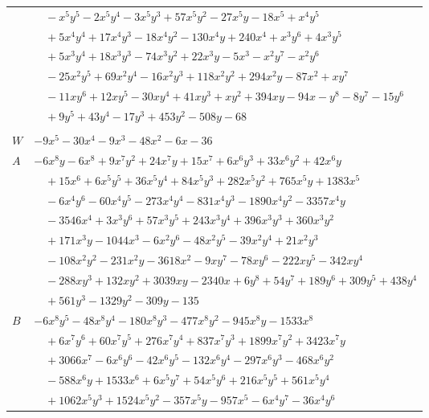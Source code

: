 \documentclass[11pt]{article}
\begin{document}
\begin{longtable}{@{}ll@{}}
 & $\quad -x^{5}y^{5}-2x^{5}y^{4}-3x^{5}y^{3}+57x^{5}y^{2}-27x^{5}y-18x^{5}+x^{4}y^{5}$\\
 & $\quad +5x^{4}y^{4}+17x^{4}y^{3}-18x^{4}y^{2}-130x^{4}y+240x^{4}+x^{3}y^{6}+4x^{3}y^{5}$\\
 & $\quad +5x^{3}y^{4}+18x^{3}y^{3}-74x^{3}y^{2}+22x^{3}y-5x^{3}-x^{2}y^{7}-x^{2}y^{6}$\\
 & $\quad -25x^{2}y^{5}+69x^{2}y^{4}-16x^{2}y^{3}+118x^{2}y^{2}+294x^{2}y-87x^{2}+xy^{7}$\\
 & $\quad -11xy^{6}+12xy^{5}-30xy^{4}+41xy^{3}+xy^{2}+394xy-94x-y^{8}-8y^{7}-15y^{6}$\\
 & $\quad +9y^{5}+43y^{4}-17y^{3}+453y^{2}-508y-68$\\
\addlinespace[3pt]
\multicolumn{2}{@{}l}{$g=2$, $i=26$, $m=1$, neighbours $46,3,5,10,11,13,15,23,24,36,40$}\\
$W$ & $-9x^{5}-30x^{4}-9x^{3}-48x^{2}-6x-36$\\
$A$ & $-6x^{8}y-6x^{8}+9x^{7}y^{2}+24x^{7}y+15x^{7}+6x^{6}y^{3}+33x^{6}y^{2}+42x^{6}y$\\
 & $\quad +15x^{6}+6x^{5}y^{5}+36x^{5}y^{4}+84x^{5}y^{3}+282x^{5}y^{2}+765x^{5}y+1383x^{5}$\\
 & $\quad -6x^{4}y^{6}-60x^{4}y^{5}-273x^{4}y^{4}-831x^{4}y^{3}-1890x^{4}y^{2}-3357x^{4}y$\\
 & $\quad -3546x^{4}+3x^{3}y^{6}+57x^{3}y^{5}+243x^{3}y^{4}+396x^{3}y^{3}+360x^{3}y^{2}$\\
 & $\quad +171x^{3}y-1044x^{3}-6x^{2}y^{6}-48x^{2}y^{5}-39x^{2}y^{4}+21x^{2}y^{3}$\\
 & $\quad -108x^{2}y^{2}-231x^{2}y-3618x^{2}-9xy^{7}-78xy^{6}-222xy^{5}-342xy^{4}$\\
 & $\quad -288xy^{3}+132xy^{2}+3039xy-2340x+6y^{8}+54y^{7}+189y^{6}+309y^{5}+438y^{4}$\\
 & $\quad +561y^{3}-1329y^{2}-309y-135$\\
$B$ & $-6x^{8}y^{5}-48x^{8}y^{4}-180x^{8}y^{3}-477x^{8}y^{2}-945x^{8}y-1533x^{8}$\\
 & $\quad +6x^{7}y^{6}+60x^{7}y^{5}+276x^{7}y^{4}+837x^{7}y^{3}+1899x^{7}y^{2}+3423x^{7}y$\\
 & $\quad +3066x^{7}-6x^{6}y^{6}-42x^{6}y^{5}-132x^{6}y^{4}-297x^{6}y^{3}-468x^{6}y^{2}$\\
 & $\quad -588x^{6}y+1533x^{6}+6x^{5}y^{7}+54x^{5}y^{6}+216x^{5}y^{5}+561x^{5}y^{4}$\\
 & $\quad +1062x^{5}y^{3}+1524x^{5}y^{2}-357x^{5}y-957x^{5}-6x^{4}y^{7}-36x^{4}y^{6}$\\

\end{longtable}
\end{document}
